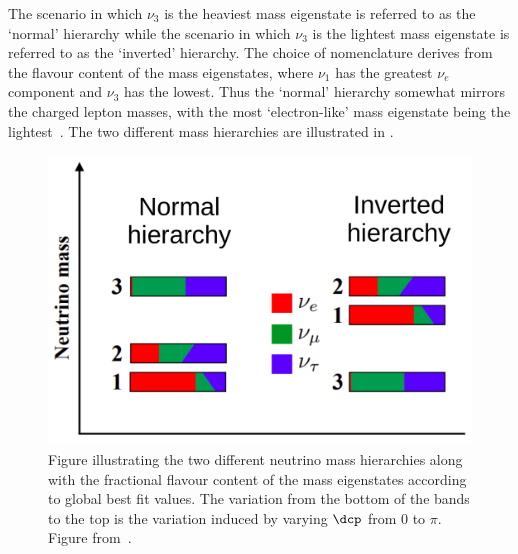 The scenario in which $\nu_{3}$ is the heaviest mass eigenstate is referred to as the `normal' hierarchy while the scenario in which $\nu_{3}$ is the lightest mass eigenstate is referred to as the `inverted' hierarchy.
The choice of nomenclature derives from the flavour content of the mass eigenstates, where $\nu_{1}$ has the greatest $\nu_{e}$ component and $\nu_{3}$ has the lowest.
Thus the `normal' hierarchy somewhat mirrors the charged lepton masses, with the most `electron-like' mass eigenstate being the lightest~\cite{massHierarchy}.
The two different mass hierarchies are illustrated in .

\begin{figure}[h]
  \centering
  \includegraphics[width=.7\linewidth]{files/figures/theory/mh}
  \caption[Diagram of neutrino mass hierarchies.]{Figure illustrating the two different neutrino mass hierarchies along with the fractional flavour content of the mass eigenstates according to global best fit values. The variation from the bottom of the bands to the top is the variation induced by varying $\dcp$ from 0 to $\pi$. Figure from~\cite{tdrVol2}.}
  \label{fig:massHierarchy}
\end{figure}

